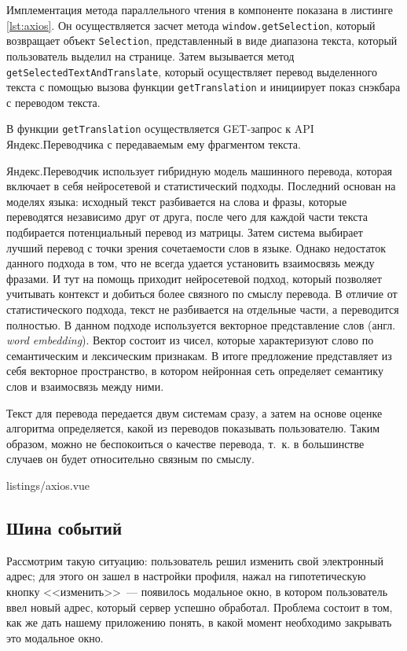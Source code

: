 Имплементация метода параллельного чтения в компоненте показана в листинге \ref{lst:axios}. Он осуществляется засчет метода \texttt{window.getSelection}, который возвращает объект \texttt{Selection}, представленный в виде диапазона текста, который пользователь выделил на странице. Затем вызывается метод \texttt{getSelectedTextAndTranslate}, который осуществляет перевод выделенного текста с помощью вызова функции \texttt{getTranslation} и инициирует показ снэкбара с переводом текста.

В функции \texttt{getTranslation} осуществляется GET-запрос к API Яндекс.Переводчика с передаваемым ему фрагментом текста.

Яндекс.Переводчик использует гибридную модель машинного перевода, которая включает в себя нейросетевой и статистический подходы. Последний основан на моделях языка: исходный текст разбивается на слова и фразы, которые переводятся независимо друг от друга, после чего для каждой части текста подбирается потенциальный перевод из матрицы. Затем система выбирает лучший перевод с точки зрения сочетаемости слов в языке. Однако недостаток данного подхода в том, что не всегда удается установить взаимосвязь между фразами. И тут на помощь приходит нейросетевой подход, который позволяет учитывать контекст и добиться более связного по смыслу перевода. В отличие от статистического подхода, текст не разбивается на отдельные части, а переводится полностью. В данном подходе используется векторное представление слов (англ. \textit{word embedding}). Вектор состоит из чисел, которые характеризуют слово по семантическим и лексическим признакам. В итоге предложение представляет из себя векторное пространство, в котором нейронная сеть определяет семантику слов и взаимосвязь между ними.

Текст для перевода передается двум системам сразу, а затем на основе оценке алгоритма определяется, какой из переводов показывать пользователю. Таким образом, можно не беспокоиться о качестве перевода, т.~к. в большинстве случаев он будет относительно связным по смыслу.


{listings/axios.vue}

\subsection{Шина событий}

Рассмотрим такую ситуацию: пользователь решил изменить свой электронный адрес; для этого он зашел в настройки профиля, нажал на гипотетическую кнопку <<изменить>>~--- появилось модальное окно, в котором пользователь ввел новый адрес, который сервер успешно обработал. Проблема состоит в том, как же дать нашему приложению понять, в какой момент необходимо закрывать это модальное окно.

